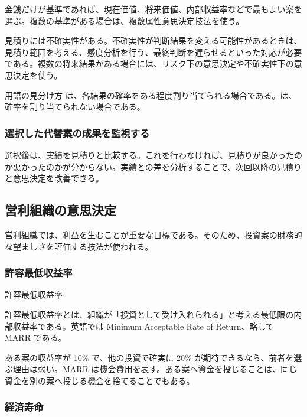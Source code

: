 \documentclass[a4paper,11pt]{ltjsarticle}
\numberwithin{figure}{section}
\numberwithin{table}{section}
\newcounter{definition}
\begin{document}
金銭だけが基準であれば、現在価値、将来価値、内部収益率などで最もよい案を選ぶ。複数の基準がある場合は、複数属性意思決定技法を使う。

見積りには不確実性がある。不確実性が判断結果を変える可能性があるときは、見積り範囲を考える、感度分析を行う、最終判断を遅らせるといった対応が必要である。複数の将来結果がある場合には、リスク下の意思決定や不確実性下の意思決定を使う。

\begin{notebox}{用語の見分け方}
は、各結果の確率をある程度割り当てられる場合である。は、確率を割り当てられない場合である。
\end{notebox}

\subsubsection{選択した代替案の成果を監視する}

選択後は、実績を見積りと比較する。これを行わなければ、見積りが良かったのか悪かったのかが分からない。実績との差を分析することで、次回以降の見積りと意思決定を改善できる。

\subsection{営利組織の意思決定}

営利組織では、利益を生むことが重要な目標である。そのため、投資案の財務的な望ましさを評価する技法が使われる。

\subsubsection{許容最低収益率}

\begin{definitionbox}許容最低収益率\par\smallskip
許容最低収益率とは、組織が「投資として受け入れられる」と考える最低限の内部収益率である。英語では Minimum Acceptable Rate of Return、略して MARR である。
\end{definitionbox}

ある案の収益率が 10\% で、他の投資で確実に 20\% が期待できるなら、前者を選ぶ理由は弱い。MARR は機会費用を表す。ある案へ資金を投じることは、同じ資金を別の案へ投じる機会を捨てることでもある。

\subsubsection{経済寿命}
\end{document}
